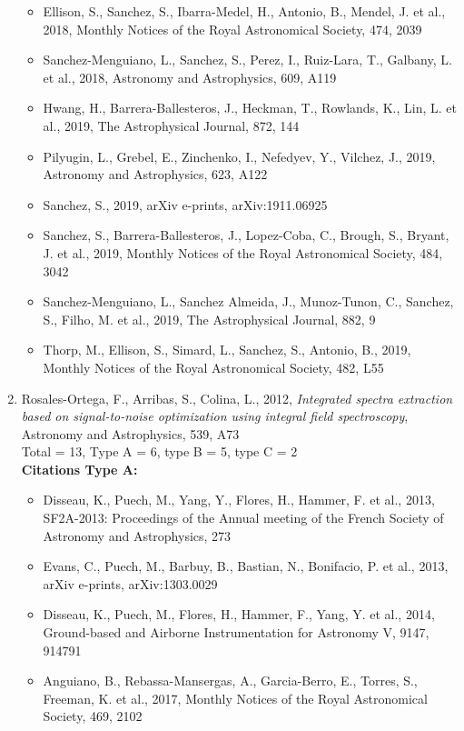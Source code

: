 \documentclass{letter}
\begin{document}
\begin{enumerate}
\begin{itemize}
\item Ellison, S., Sanchez, S., Ibarra-Medel, H., Antonio, B., Mendel, J. et al., 2018, Monthly Notices of the Royal Astronomical Society, 474, 2039
\item Sanchez-Menguiano, L., Sanchez, S., Perez, I., Ruiz-Lara, T., Galbany, L. et al., 2018, Astronomy and Astrophysics, 609, A119
\item Hwang, H., Barrera-Ballesteros, J., Heckman, T., Rowlands, K., Lin, L. et al., 2019, The Astrophysical Journal, 872, 144
\item Pilyugin, L., Grebel, E., Zinchenko, I., Nefedyev, Y., Vilchez, J., 2019, Astronomy and Astrophysics, 623, A122
\item Sanchez, S., 2019, arXiv e-prints, arXiv:1911.06925
\item Sanchez, S., Barrera-Ballesteros, J., Lopez-Coba, C., Brough, S., Bryant, J. et al., 2019, Monthly Notices of the Royal Astronomical Society, 484, 3042
\item Sanchez-Menguiano, L., Sanchez Almeida, J., Munoz-Tunon, C., Sanchez, S., Filho, M. et al., 2019, The Astrophysical Journal, 882, 9
\item Thorp, M., Ellison, S., Simard, L., Sanchez, S., Antonio, B., 2019, Monthly Notices of the Royal Astronomical Society, 482, L55
\end{itemize}
\item Rosales-Ortega, F., Arribas, S., Colina, L., 2012, {\it Integrated spectra extraction based on signal-to-noise optimization using integral field spectroscopy}, Astronomy and Astrophysics, 539, A73 \\ 
Total = 13, Type A = 6, type B = 5, type C = 2 \\ 
{\bf Citations Type A:}
\begin{itemize}
\item Disseau, K., Puech, M., Yang, Y., Flores, H., Hammer, F. et al., 2013, SF2A-2013: Proceedings of the Annual meeting of the French Society of Astronomy and Astrophysics, 273
\item Evans, C., Puech, M., Barbuy, B., Bastian, N., Bonifacio, P. et al., 2013, arXiv e-prints, arXiv:1303.0029
\item Disseau, K., Puech, M., Flores, H., Hammer, F., Yang, Y. et al., 2014, Ground-based and Airborne Instrumentation for Astronomy V, 9147, 914791
\item Anguiano, B., Rebassa-Mansergas, A., Garcia-Berro, E., Torres, S., Freeman, K. et al., 2017, Monthly Notices of the Royal Astronomical Society, 469, 2102

\end{itemize}
\end{enumerate}
\end{document}
